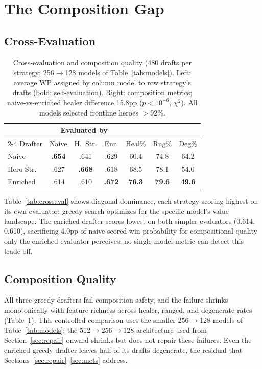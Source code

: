 \documentclass[journal]{IEEEtran}
\begin{document}
\section{The Composition Gap}
\label{sec:gap}

\subsection{Cross-Evaluation}
\label{sec:crosseval}

\begin{table}[t]
\centering
\caption{Cross-evaluation and composition quality (480 drafts per strategy; 256$\to$128 models of Table~\ref{tab:models}). Left: average WP assigned by column model to row strategy's drafts (bold: self-evaluation). Right: composition metrics; naive-vs-enriched healer difference 15.8pp ($p < 10^{-6}$, $\chi^2$). All models selected frontline heroes $>$92\%.}
\label{tab:crosseval}\label{tab:comp}
\setlength{\tabcolsep}{4pt}
\begin{tabular}{lccc|ccc}
\toprule
& \multicolumn{3}{c}{Evaluated by} & & & \\
\cmidrule(lr){2-4}
Drafter & Naive & H.~Str. & Enr. & Heal\% & Rng\% & Deg\% \\
\midrule
Naive & \textbf{.654} & .641 & .629 & 60.4 & 74.8 & 64.2 \\
Hero Str. & .627 & \textbf{.668} & .618 & 68.5 & 78.1 & 54.0 \\
Enriched & .614 & .610 & \textbf{.672} & \textbf{76.3} & \textbf{79.6} & \textbf{49.6} \\
\bottomrule
\end{tabular}
\end{table}

Table~\ref{tab:crosseval} shows diagonal dominance, each strategy scoring highest on its own evaluator: greedy search optimizes for the specific model's value landscape. The enriched drafter scores lowest on both simpler evaluators (0.614, 0.610), sacrificing 4.0pp of naive-scored win probability for compositional quality only the enriched evaluator perceives; no single-model metric can detect this trade-off.

\subsection{Composition Quality}

All three greedy drafters fail composition safety, and the failure shrinks monotonically with feature richness across healer, ranged, and degenerate rates (Table~\ref{tab:comp}). This controlled comparison uses the smaller 256$\to$128 models of Table~\ref{tab:models}; the 512$\to$256$\to$128 architecture used from Section~\ref{sec:repair} onward shrinks but does not repair these failures. Even the enriched greedy drafter leaves half of its drafts degenerate, the residual that Sections~\ref{sec:repair}--\ref{sec:mcts} address.
\end{document}
